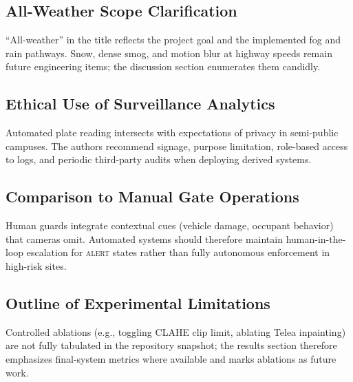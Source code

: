 \subsection{All-Weather Scope Clarification}
``All-weather'' in the title reflects the project goal and the implemented fog and rain pathways. Snow, dense smog, and motion blur at highway speeds remain future engineering items; the discussion section enumerates them candidly.

\subsection{Ethical Use of Surveillance Analytics}
Automated plate reading intersects with expectations of privacy in semi-public campuses. The authors recommend signage, purpose limitation, role-based access to logs, and periodic third-party audits when deploying derived systems.

\subsection{Comparison to Manual Gate Operations}
Human guards integrate contextual cues (vehicle damage, occupant behavior) that cameras omit. Automated systems should therefore maintain human-in-the-loop escalation for \textsc{alert} states rather than fully autonomous enforcement in high-risk sites.

\subsection{Outline of Experimental Limitations}
Controlled ablations (e.g., toggling CLAHE clip limit, ablating Telea inpainting) are not fully tabulated in the repository snapshot; the results section therefore emphasizes final-system metrics where available and marks ablations as future work.
